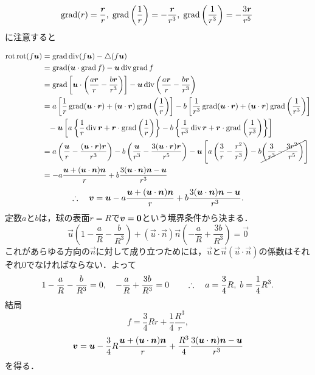\begin{details}
\[
    \operatorname{grad}(r) = \frac{\vb*{r}}{r}, \;
    \operatorname{grad} \left( \frac{1}{r} \right) = -\frac{\vb*{r}}{r^3}, \;
    \operatorname{grad} \left( \frac{1}{r^3} \right) = -\frac{3\vb*{r}}{r^5} \;
\]
に注意すると
\end{details}

\begin{align*}
    \operatorname{rot}\operatorname{rot} (f \vb*{u}) &= \operatorname{grad} \operatorname{div} (f \vb*{u}) - \triangle (f \vb*{u}) \\
    &= \operatorname{grad} (\vb*{u}\cdot\operatorname{grad} f) - \vb*{u}\operatorname{div} \operatorname{grad} f \\
    &= \operatorname{grad} \left[ \vb*{u} \cdot \left( \frac{a\vb*{r}}{r}-\frac{b\vb*{r}}{r^3} \right) \right] - \vb*{u}\operatorname{div} \left( \frac{a\vb*{r}}{r}-\frac{b\vb*{r}}{r^3} \right) \\
    &= a \left[ \frac{1}{r} \operatorname{grad}(\vb*{u}\cdot\vb*{r}) + (\vb*{u}\cdot\vb*{r}) \operatorname{grad} \left( \frac{1}{r} \right) \right]
      -b \left[ \frac{1}{r^3} \operatorname{grad}(\vb*{u}\cdot\vb*{r}) + (\vb*{u}\cdot\vb*{r}) \operatorname{grad} \left( \frac{1}{r^3} \right) \right] \\
    &\phantom{=} -\vb*{u} \left[ 
        a \left\{ \frac{1}{r} \operatorname{div}\vb*{r} + \vb*{r} \cdot \operatorname{grad} \left( \frac{1}{r} \right) \right\} 
       -b \left\{ \frac{1}{r^3} \operatorname{div}\vb*{r} + \vb*{r} \cdot \operatorname{grad} \left( \frac{1}{r^3} \right) \right\} 
    \right] \\
    &= a \left( \frac{\vb*{u}}{r} - \frac{(\vb*{u}\cdot\vb*{r})\vb*{r}}{r^3} \right) -b \left( \frac{\vb*{u}}{r^3} - \frac{3(\vb*{u}\cdot\vb*{r})\vb*{r}}{r^5} \right)
    -\vb*{u} \left[ a\left( \frac{3}{r} - \frac{r^2}{r^3} \right) -b \cancel{ \left( \frac{3}{r^3} - \frac{3r^2}{r^5} \right) } \right] \\
    &= -a \frac{ \vb*{u} + (\vb*{u}\cdot\vb*{n}) \vb*{n} }{r} +b \frac{ 3(\vb*{u}\cdot\vb*{n}) \vb*{n} - \vb*{u} }{r^3}
\end{align*}
\begin{equation}\label{eq20.7:a,bで表したStokes流の速度}
    \therefore\quad \vb*{v} = \vb*{u} -a \frac{ \vb*{u} + (\vb*{u}\cdot\vb*{n}) \vb*{n} }{r} +b \frac{ 3(\vb*{u}\cdot\vb*{n}) \vb*{n} - \vb*{u} }{r^3} .
\end{equation}
定数$a$と$b$は，球の表面$r=R$で$\vb*{v}=\vb*{0}$という境界条件から決まる．
\[
    \vec{u} \left( 1-\frac{a}{R}-\frac{b}{R^3} \right) + (\vec{u}\cdot\vec{n}) \vec{n} \left( -\frac{a}{R}+\frac{3b}{R^3} \right) = \vec{0}
\]
これがあらゆる方向の$\vec{n}$に対して成り立つためには，$\vec{u}$と$\vec{n}(\vec{u}\cdot\vec{n})$の係数はそれぞれ0でなければならない．よって
\[
    1-\frac{a}{R}-\frac{b}{R^3} = 0, \quad -\frac{a}{R}+\frac{3b}{R^3} = 0
    \qquad\therefore\quad a = \frac{3}{4}R, \; b = \frac{1}{4} R^3 .
\]
結局
\begin{equation}
    f = \frac{3}{4}Rr + \frac{1}{4} \frac{R^3}{r},
\end{equation}
\begin{equation}\label{eq20.9:Stokes流での流速}
    \vb*{v} = \vb*{u} - \frac{3}{4}R \frac{\vb*{u}+(\vb*{u}\cdot\vb*{n})\vb*{n}}{r} + \frac{R^3}{4} \frac{3(\vb*{u}\cdot\vb*{n})\vb*{n} - \vb*{u}}{r^3}
\end{equation}
を得る．


